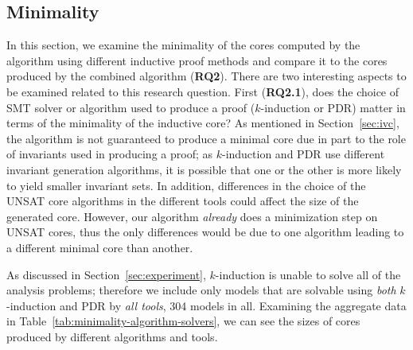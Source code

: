 \subsection{Minimality}
\label{sec:minimality}
In this section, we examine the minimality of the cores computed by
the \ucalg algorithm using different inductive proof methods and
compare it to the cores produced by the combined algorithm
(\textbf{RQ2}). There are two interesting aspects to be examined
related to this research question. First (\textbf{RQ2.1}), does the
choice of SMT solver or algorithm used to produce a proof
($k$-induction or PDR) matter in terms of the minimality of the
inductive core? As mentioned in Section~\ref{sec:ivc}, the \ucalg
algorithm is not guaranteed to produce a minimal core due in part to
the role of invariants used in producing a proof; as $k$-induction and
PDR use different invariant generation algorithms, it is possible that
one or the other is more likely to yield smaller invariant sets. In
addition, differences in the choice of the UNSAT core algorithms in
the different tools could affect the size of the generated core.
However, our algorithm {\em already} does a minimization step on UNSAT
cores, thus the only differences would be due to one algorithm leading
to a different minimal core than another.

As discussed in Section~\ref{sec:experiment}, $k$-induction is unable to solve all of the analysis problems; therefore we include only models that are solvable using {\em both} $k$-induction and PDR by {\em all tools}, 304 models in all.  Examining the aggregate data in Table~\ref{tab:minimality-algorithm-solvers}, we can see the sizes of cores produced by different algorithms and tools.







